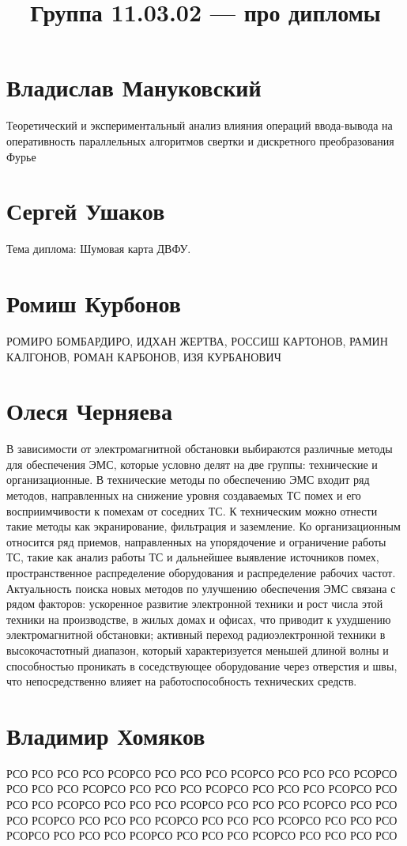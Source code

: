 \documentclass{article}
\title{Группа 11.03.02 --- про дипломы}
\begin{document}
\section*{Владислав Мануковский}
Теоретический и экспериментальный анализ влияния операций ввода-вывода на оперативность параллельных алгоритмов свертки и дискретного преобразования Фурье

\section*{Сергей Ушаков}

Тема диплома: Шумовая карта ДВФУ.

\section*{Ромиш Курбонов}

РОМИРО БОМБАРДИРО, ИДХАН ЖЕРТВА, РОССИШ КАРТОНОВ, РАМИН КАЛГОНОВ, РОМАН КАРБОНОВ, ИЗЯ КУРБАНОВИЧ

\section*{Олеся Черняева}
В зависимости от электромагнитной обстановки выбираются различные методы для обеспечения ЭМС, которые условно делят на две группы: технические и организационные. В технические методы по обеспечению ЭМС входит ряд методов, направленных на снижение уровня создаваемых ТС помех и его восприимчивости к помехам от соседних ТС. К техническим можно отнести такие методы как экранирование, фильтрация и заземление. Ко организационным относится ряд приемов, направленных на упорядочение и ограничение работы ТС, такие как анализ работы ТС и дальнейшее выявление источников помех, пространственное распределение оборудования и распределение рабочих частот. 
Актуальность поиска новых методов по улучшению обеспечения ЭМС связана с рядом факторов: ускоренное развитие электронной техники и рост числа этой техники на производстве, в жилых домах и офисах, что приводит к ухудшению электромагнитной обстановки; активный переход радиоэлектронной техники в высокочастотный диапазон, который характеризуется меньшей длиной волны и способностью проникать в соседствующее оборудование через отверстия и швы, что непосредственно влияет на работоспособность технических средств. 

\section*{Владимир Хомяков}
РСО РСО РСО РСО РСОРСО РСО РСО РСО РСОРСО РСО РСО РСО РСОРСО РСО РСО РСО РСОРСО РСО РСО РСО РСОРСО РСО РСО РСО РСОРСО РСО РСО РСО РСОРСО РСО РСО РСО РСОРСО РСО РСО РСО РСОРСО РСО РСО РСО РСОРСО РСО РСО РСО РСОРСО РСО РСО РСО РСОРСО РСО РСО РСО РСОРСО РСО РСО РСО РСОРСО РСО РСО РСО РСОРСО РСО РСО РСО РСО
\end{document}
